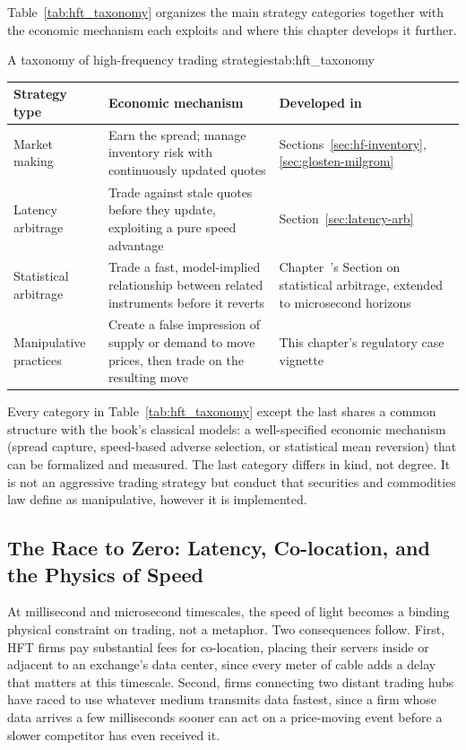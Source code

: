 \documentclass[../ai_in_finance]{subfiles}
\begin{document}
Table~\ref{tab:hft_taxonomy} organizes the main strategy categories together with the economic mechanism each exploits and where this chapter develops it further.

\begin{booktable}[htbp]{A taxonomy of high-frequency trading strategies}{tab:hft_taxonomy}
\begin{tabular}{L{2.6cm}L{5.4cm}L{4.2cm}}
\toprule
Strategy type & Economic mechanism & Developed in \\
\midrule
Market making & Earn the spread; manage inventory risk with continuously updated quotes & Sections~\ref{sec:hf-inventory}, \ref{sec:glosten-milgrom} \\
Latency arbitrage & Trade against stale quotes before they update, exploiting a pure speed advantage & Section~\ref{sec:latency-arb} \\
Statistical arbitrage & Trade a fast, model-implied relationship between related instruments before it reverts & Chapter~'s Section on statistical arbitrage, extended to microsecond horizons \\
Manipulative practices & Create a false impression of supply or demand to move prices, then trade on the resulting move & This chapter's regulatory case vignette \\
\bottomrule
\end{tabular}
\end{booktable}

Every category in Table~\ref{tab:hft_taxonomy} except the last shares a common structure with the book's classical models: a well-specified economic mechanism (spread capture, speed-based adverse selection, or statistical mean reversion) that can be formalized and measured. The last category differs in kind, not degree. It is not an aggressive trading strategy but conduct that securities and commodities law define as manipulative, however it is implemented.

\subsection{The Race to Zero: Latency, Co-location, and the Physics of Speed}
\label{sec:race-to-zero}

At millisecond and microsecond timescales, the speed of light becomes a binding physical constraint on trading, not a metaphor. Two consequences follow. First, HFT firms pay substantial fees for co-location, placing their servers inside or adjacent to an exchange's data center, since every meter of cable adds a delay that matters at this timescale. Second, firms connecting two distant trading hubs have raced to use whatever medium transmits data fastest, since a firm whose data arrives a few milliseconds sooner can act on a price-moving event before a slower competitor has even received it.
\end{document}
